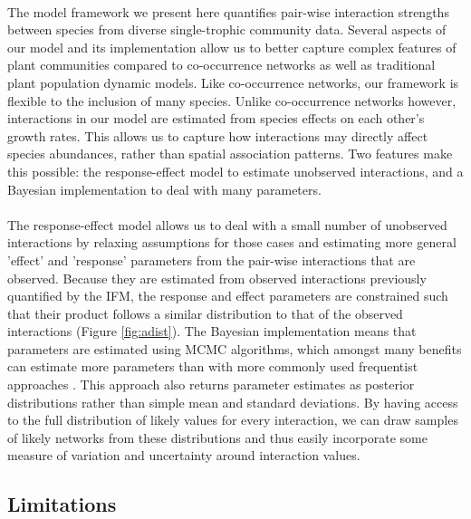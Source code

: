 \documentclass[a4,12pt]{article}
\begin{document}
    \paragraph{}
    The model framework we present here quantifies pair-wise interaction strengths between species from diverse single-trophic community data. Several aspects of our model and its implementation allow us to better capture complex features of plant communities compared to co-occurrence networks as well as traditional plant population dynamic models. Like co-occurrence networks, our framework is flexible to the inclusion of many species. Unlike co-occurrence networks however, interactions in our model are estimated from species effects on each other's growth rates. This allows us to capture how interactions may directly affect species abundances, rather than spatial association patterns. Two features make this possible: the response-effect model to estimate unobserved interactions, and a Bayesian implementation to deal with many parameters. 

    \paragraph{}
    The response-effect model allows us to deal with a small number of unobserved interactions by relaxing assumptions for those cases and estimating more general 'effect' and 'response' parameters from the pair-wise interactions that are observed. Because they are estimated from observed interactions previously quantified by the IFM, the response and effect parameters are constrained such that their product follows a similar distribution to that of the observed interactions (Figure \ref{fig:adist}). The Bayesian implementation means that parameters are estimated using MCMC algorithms, which amongst many benefits can estimate more parameters than with more commonly used frequentist approaches \parencite{Dorazio2016}. This approach also returns parameter estimates as posterior distributions rather than simple mean and standard deviations. By having access to the full distribution of likely values for every interaction, we can draw samples of likely networks from these distributions and thus easily incorporate some measure of variation and uncertainty around interaction values. 

    \subsection{Limitations}
        
\end{document}

